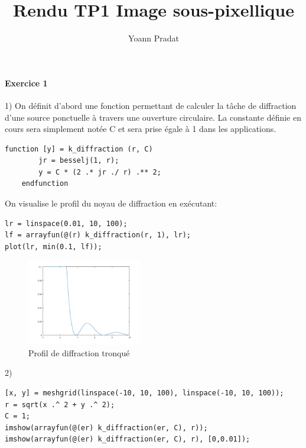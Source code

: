 \documentclass[a4paper, 11pt]{article}
\begin{document}
\title{Rendu TP1 Image sous-pixellique}
\author{Yoann Pradat}
\maketitle

\paragraph{Exercice 1}


1) On définit d'abord une fonction permettant de calculer la tâche de diffraction d'une source ponctuelle à travers une
ouverture circulaire. La constante définie en cours sera simplement notée C et sera prise égale à 1 dans les
applications.

\begin{lstlisting}[frame=single]
    function [y] = k_diffraction (r, C)
        jr = besselj(1, r);
        y = C * (2 .* jr ./ r) .** 2;
    endfunction
\end{lstlisting}

On visualise le profil du noyau de diffraction en exécutant:

\begin{lstlisting}[frame=single]
lr = linspace(0.01, 10, 100);
lf = arrayfun(@(r) k_diffraction(r, 1), lr);
plot(lr, min(0.1, lf));
\end{lstlisting}

\begin{figure}[!h]
\centering
\includegraphics[width=5cm]{profil_1d.png}
\caption{Profil de diffraction tronqué}
\end{figure}


2)
\begin{lstlisting}[frame=single]
[x, y] = meshgrid(linspace(-10, 10, 100), linspace(-10, 10, 100));
r = sqrt(x .^ 2 + y .^ 2);
C = 1;
imshow(arrayfun(@(er) k_diffraction(er, C), r));
imshow(arrayfun(@(er) k_diffraction(er, C), r), [0,0.01]);
\end{lstlisting}
\end{document}
